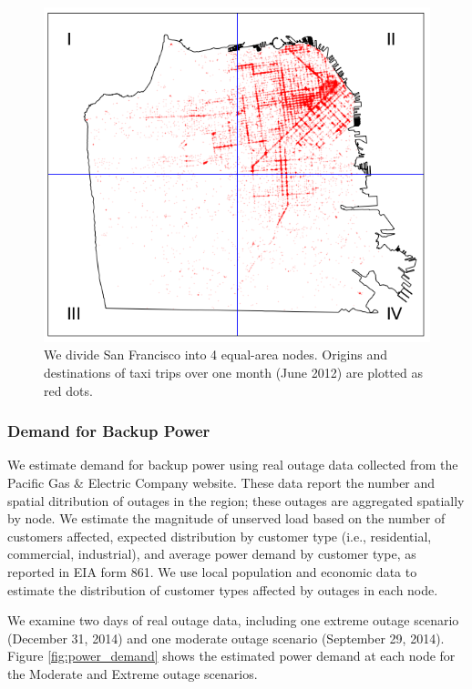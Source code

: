 \documentclass[journal]{IEEEtran}
\begin{document}
\begin{figure}[!htbp]
  \includegraphics[width=\linewidth]{plots/grid1-cropped.png}
  \caption{We divide San Francisco into 4 equal-area nodes. Origins and destinations of taxi trips over one month (June 2012) are plotted as red dots.}
  \label{fig:sf}
\end{figure}

\subsubsection{Demand for Backup Power}
We estimate demand for backup power using real outage data collected from the Pacific Gas \& Electric Company website. These data report the number and spatial ditribution of outages in the region; these outages are aggregated spatially by node. We estimate the magnitude of unserved load based on the number of customers affected, expected distribution by customer type (i.e., residential, commercial, industrial), and average power demand by customer type, as reported in EIA form 861. We use local population and economic data to estimate the distribution of customer types affected by outages in each node.

We examine two days of real outage data, including one extreme outage scenario (December 31, 2014) and one moderate outage scenario (September 29, 2014). Figure \ref{fig:power_demand} shows the estimated power demand at each node for the Moderate and Extreme outage scenarios.
\end{document}
